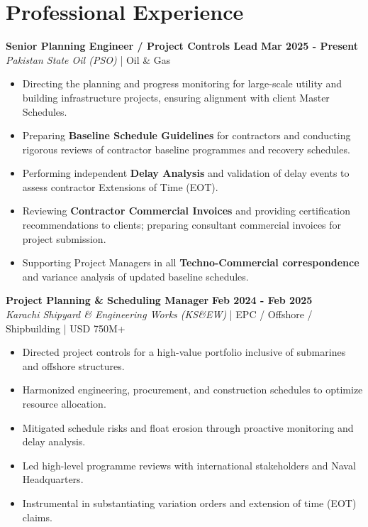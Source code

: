 \documentclass[11pt,a4paper]{article}
\begin{document}
\section{Professional Experience}
\noindent \textbf{\large Senior Planning Engineer / Project Controls Lead} \hfill \textbf{\color{awesome-blue}Mar 2025 - Present}\\
\textit{Pakistan State Oil (PSO)} | Oil \& Gas\\
\begin{itemize}
    \item Directing the planning and progress monitoring for large-scale utility and building infrastructure projects, ensuring alignment with client Master Schedules.
    \item Preparing \textbf{Baseline Schedule Guidelines} for contractors and conducting rigorous reviews of contractor baseline programmes and recovery schedules.
    \item Performing independent \textbf{Delay Analysis} and validation of delay events to assess contractor Extensions of Time (EOT).
    \item Reviewing \textbf{Contractor Commercial Invoices} and providing certification recommendations to clients; preparing consultant commercial invoices for project submission.
    \item Supporting Project Managers in all \textbf{Techno-Commercial correspondence} and variance analysis of updated baseline schedules.
\end{itemize}

\noindent \textbf{\large Project Planning \& Scheduling Manager} \hfill \textbf{\color{awesome-blue}Feb 2024 - Feb 2025}\\
\textit{Karachi Shipyard \& Engineering Works (KS\&EW)} | EPC / Offshore / Shipbuilding | USD 750M+\\
\begin{itemize}
    \item Directed project controls for a high-value portfolio inclusive of submarines and offshore structures.
    \item Harmonized engineering, procurement, and construction schedules to optimize resource allocation.
    \item Mitigated schedule risks and float erosion through proactive monitoring and delay analysis.
    \item Led high-level programme reviews with international stakeholders and Naval Headquarters.
    \item Instrumental in substantiating variation orders and extension of time (EOT) claims.
\end{itemize}
\end{document}

